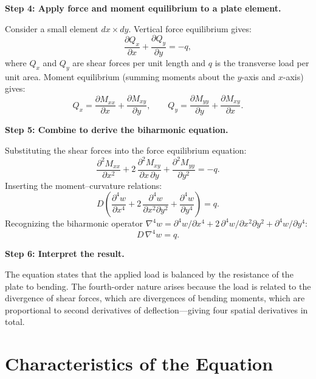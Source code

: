 \textbf{Step 4: Apply force and moment equilibrium to a plate element.}

Consider a small element $dx \times dy$. Vertical force equilibrium gives:
\begin{equation}
\frac{\partial Q_x}{\partial x} + \frac{\partial Q_y}{\partial y} = -q,
\end{equation}
where $Q_x$ and $Q_y$ are shear forces per unit length and $q$ is the transverse load per unit area. Moment equilibrium (summing moments about the $y$-axis and $x$-axis) gives:
\begin{equation}
Q_x = \frac{\partial M_{xx}}{\partial x} + \frac{\partial M_{xy}}{\partial y}, \qquad Q_y = \frac{\partial M_{yy}}{\partial y} + \frac{\partial M_{xy}}{\partial x}.
\end{equation}

\textbf{Step 5: Combine to derive the biharmonic equation.}

Substituting the shear forces into the force equilibrium equation:
\begin{equation}
\frac{\partial^{2}M_{xx}}{\partial x^{2}} + 2\,\frac{\partial^{2}M_{xy}}{\partial x\,\partial y} + \frac{\partial^{2}M_{yy}}{\partial y^{2}} = -q.
\end{equation}
Inserting the moment--curvature relations:
\begin{equation}
D\!\left(\frac{\partial^{4}w}{\partial x^{4}} + 2\,\frac{\partial^{4}w}{\partial x^{2}\partial y^{2}} + \frac{\partial^{4}w}{\partial y^{4}}\right) = q.
\end{equation}
Recognizing the biharmonic operator $\nabla^{4}w = \partial^{4}w/\partial x^{4} + 2\,\partial^{4}w/\partial x^{2}\partial y^{2} + \partial^{4}w/\partial y^{4}$:
\begin{equation}
\boxed{\;D\,\nabla^{4}w = q.\;}
\end{equation}

\textbf{Step 6: Interpret the result.}

The equation states that the applied load is balanced by the resistance of the plate to bending. The fourth-order nature arises because the load is related to the divergence of shear forces, which are divergences of bending moments, which are proportional to second derivatives of deflection---giving four spatial derivatives in total.

\section*{Characteristics of the Equation}

